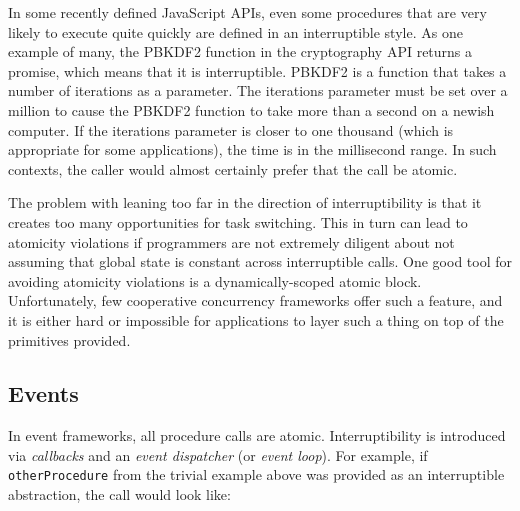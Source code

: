 \documentclass[9pt,preprint]{sigplanconf}
\begin{document}
In some recently defined JavaScript APIs, even some procedures that are very likely to execute quite quickly are defined in an interruptible style.
As one example of many, the PBKDF2 function in the cryptography API returns a promise, which means that it is interruptible.
PBKDF2 is a function that takes a number of iterations as a parameter.
The iterations parameter must be set over a million to cause the PBKDF2 function to take more than a second on a newish computer.
If the iterations parameter is closer to one thousand (which is appropriate for some applications), the time is in the millisecond range.
In such contexts, the caller would almost certainly prefer that the call be atomic.

The problem with leaning too far in the direction of interruptibility is that it creates too many opportunities for task switching.
This in turn can lead to atomicity violations if programmers are not extremely diligent about not assuming that global state is constant across interruptible calls.
One good tool for avoiding atomicity violations is a dynamically-scoped atomic block.
Unfortunately, few cooperative concurrency frameworks offer such a feature, and it is either hard or impossible for applications to layer such a thing on top of the primitives provided.

\subsection{Events}


In event frameworks, all procedure calls are atomic.
Interruptibility is introduced via \emph{callbacks} and an \emph{event dispatcher} (or \emph{event loop}).
For example, if \texttt{otherProcedure} from the trivial example above was provided as an interruptible abstraction, the call would look like:
\end{document}
